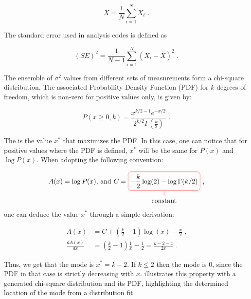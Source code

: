 \begin{equation}
    \bar{X} = \frac{1}{N} \sum_{i=1}^{N} X_{i} \text{ .}
    \label{equation:normal_mean}
\end{equation}

The standard error used in analysis codes is defined as

\begin{equation}
    (SE)^{2} = \frac{1}{N-1} \sum_{i=1}^{N} \left( X_{i} - \bar{X} \right)^{2} \text{ .}
    \label{equation:omc3_standard_error}
\end{equation}

The ensemble of \(\sigma^{2}\) values from different sets of measurements form a chi-square distribution. 
The associated Probability Density Function (PDF) for \(k\) degrees of freedom, which is non-zero for positive values only, is given by:

\begin{equation}
    P(x \geq 0, k) = \frac{x^{k/2-1} e^{-x/2}} {2^{k/2} \Gamma(\frac{k}{2})} \text{ .}
    \label{equation:chi2_pdf_equation}
\end{equation}

The  is the value \(x^{*}\) that maximizes the PDF.
In this case, one can notice that for positive values where the PDF is defined, \(x^{*}\) will be the same for \(P(x)\) and \(\log P(x)\).
When adopting the following convention:

\begin{equation}
    \centering
    A(x) = \log P(x) \mbox{,   and  } C =
    \tikz[baseline]{
        \node[draw=red,rounded corners,anchor=base] (m5)
        {\(\displaystyle - \frac{k}{2} \log(2) - \log \Gamma(k/2)\)};
        \node[below of=m5] (12) {constant};
        \draw[-,red] (12) -- (m5)
    } \text{ ,}
    \label{equation:chi2_pdf_derivation_convention}
\end{equation}
one can deduce the value \(x^{*}\) through a simple derivation:

\begin{equation}
	\begin{aligned}
    A(x)              &= C + \left( \frac{k}{2} - 1 \right) \log(x) - \frac{x}{2} \text{ ,} \\
    \frac{d A(x)}{dx} &= \left( \frac{k}{2} - 1 \right) \frac{1}{x} - \frac{1}{2} = \frac{k - 2 - x}{2x} \text{ .}
	\end{aligned}	
    \label{equation:chi2_pdf_mode_proof}
\end{equation}

Thus, we get that the mode is \(x^{*} = k - 2\).
If \(k \leq 2\) then the mode is 0, since the PDF in that case is strictly decreasing with \(x\).
 illustrates this property with a generated chi-square distribution and its PDF, highlighting the determined location of the mode from a distribution fit.


